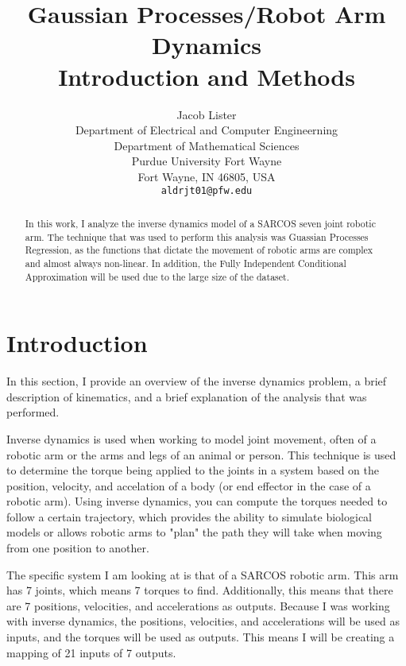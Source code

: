 \documentclass{article}
\title{Gaussian Processes/Robot Arm Dynamics \\ Introduction and Methods}
\author {Jacob Lister                              \\
Department of Electrical and Computer Engineerning \\
Department of Mathematical Sciences                \\
Purdue University Fort Wayne                       \\
Fort Wayne, IN 46805, USA                          \\
\texttt{aldrjt01@pfw.edu}
}
\begin{document}
    \maketitle

    \begin{abstract}
        In this work, I analyze the inverse dynamics model of a SARCOS seven joint robotic arm.
        The technique that was used to perform this analysis was Guassian Processes Regression,
        as the functions that dictate the movement of robotic arms are complex and almost always
        non-linear. In addition, the Fully Independent Conditional Approximation will be used
        due to the large size of the dataset.
    \end{abstract}

    \section{Introduction}
    

    In this section, I provide an overview of the inverse dynamics problem, a brief description
    of kinematics, and a brief explanation of the analysis that was performed.
    
    Inverse dynamics is used when working to model joint movement, often of a robotic arm or
    the arms and legs of an animal or person. This technique is used to determine the torque
    being applied to the joints in a system based on the position, velocity, and accelation of
    a body (or end effector in the case of a robotic arm). Using inverse dynamics, you can
    compute the torques needed to follow a certain trajectory, which provides the ability to
    simulate biological models or allows robotic arms to "plan" the path they will take when
    moving from one position to another.
    
    The specific system I am looking at is that of a SARCOS robotic arm. This arm has 7 joints,
    which means 7 torques to find. Additionally, this means that there are 7 positions, velocities,
    and accelerations as outputs. Because I was working with inverse dynamics, the positions,
    velocities, and accelerations will be used as inputs, and the torques will be used as outputs.
    This means I will be creating a mapping of 21 inputs of 7 outputs.
    
\end{document}
